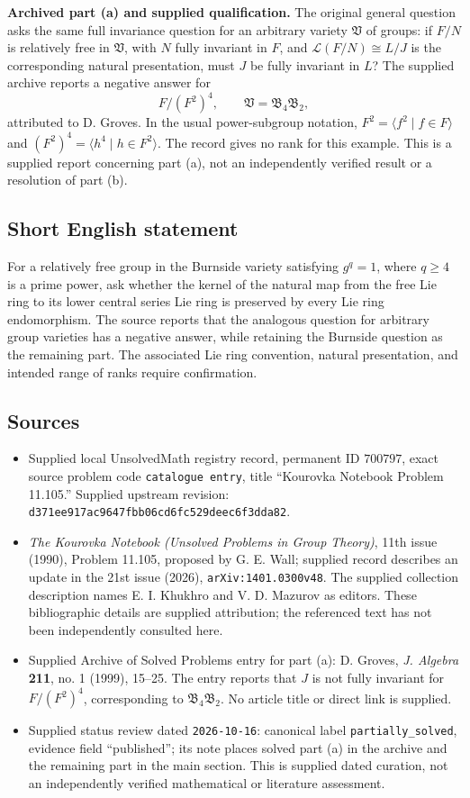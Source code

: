\documentclass[11pt]{article}
\begin{document}
\textbf{Archived part (a) and supplied qualification.} The original general question asks the same full invariance question for an arbitrary variety \(\mathfrak V\) of groups: if \(F/N\) is relatively free in \(\mathfrak V\), with \(N\) fully invariant in \(F\), and \(\mathcal L(F/N)\cong L/J\) is the corresponding natural presentation, must \(J\) be fully invariant in \(L\)? The supplied archive reports a negative answer for
\[
F/(F^2)^4,\qquad\mathfrak V=\mathfrak B_4\mathfrak B_2,
\]
attributed to D. Groves. In the usual power-subgroup notation, \(F^2=\langle f^2\mid f\in F\rangle\) and \((F^2)^4=\langle h^4\mid h\in F^2\rangle\). The record gives no rank for this example. This is a supplied report concerning part (a), not an independently verified result or a resolution of part (b).
\subsection{Short English statement}
For a relatively free group in the Burnside variety satisfying \(g^q=1\), where \(q\geq 4\) is a prime power, ask whether the kernel of the natural map from the free Lie ring to its lower central series Lie ring is preserved by every Lie ring endomorphism. The source reports that the analogous question for arbitrary group varieties has a negative answer, while retaining the Burnside question as the remaining part. The associated Lie ring convention, natural presentation, and intended range of ranks require confirmation.
\subsection{Sources}
\begin{itemize}
\item Supplied local UnsolvedMath registry record, permanent ID \(700797\), exact source problem code \texttt{catalogue entry}, title ``Kourovka Notebook Problem 11.105.'' Supplied upstream revision: \texttt{d371ee917ac9647fbb06cd6fc529deec6f3dda82}.
\item \emph{The Kourovka Notebook (Unsolved Problems in Group Theory)}, 11th issue (1990), Problem 11.105, proposed by G. E. Wall; supplied record describes an update in the 21st issue (2026), \texttt{arXiv:1401.0300v48}. The supplied collection description names E. I. Khukhro and V. D. Mazurov as editors. These bibliographic details are supplied attribution; the referenced text has not been independently consulted here.
\item Supplied Archive of Solved Problems entry for part (a): D. Groves, \emph{J. Algebra} \textbf{211}, no. 1 (1999), 15--25. The entry reports that \(J\) is not fully invariant for \(F/(F^2)^4\), corresponding to \(\mathfrak B_4\mathfrak B_2\). No article title or direct link is supplied.
\item Supplied status review dated \texttt{2026-10-16}: canonical label \texttt{partially\_solved}, evidence field ``published''; its note places solved part (a) in the archive and the remaining part in the main section. This is supplied dated curation, not an independently verified mathematical or literature assessment.
\end{itemize}
\end{document}
